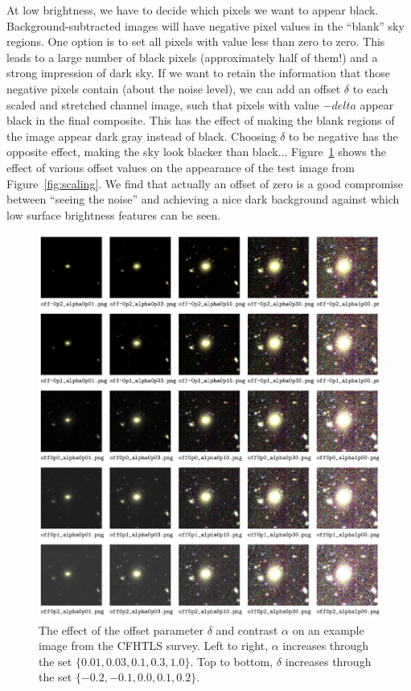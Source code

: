 \documentclass[letterpaper, 11pt]{article}
\begin{document}
At low brightness, we have to decide which pixels we want to appear black.
Background-subtracted images will have negative pixel values in the ``blank''
sky regions. One option is to set all pixels with value less than zero to
zero. This leads to a large number of black pixels (approximately half of
them!) and a strong impression of dark sky. If we want to retain the
information that those negative pixels contain (about the noise level), we can
add an offset $\delta$ to each scaled and stretched channel image, such that
pixels with value $-delta$ appear black in the final composite. This has the
effect of making the blank regions of the image appear dark gray instead of
black. Choosing $\delta$ to be negative has the opposite effect, making the
sky look blacker than black... Figure~\ref{fig:offset} shows the effect of
various offset values on the appearance of the test image from
Figure~\ref{fig:scaling}. We find that actually an offset of zero is a good
compromise between ``seeing the noise'' and achieving a nice dark background
against which low surface brightness features can be seen.

\begin{figure}
\centering\includegraphics[width=0.9\linewidth]{Images/CFHTLS_27_offset-alpha_gallery.png}
\caption{The effect of the offset parameter $\delta$ and contrast 
$\alpha$ on an
example image from the CFHTLS survey. Left to right, $\alpha$ increases
through the set $\{0.01,0.03,0.1,0.3,1.0\}$. Top to bottom, $\delta$ increases
through the set $\{-0.2,-0.1,0.0,0.1,0.2\}$.}
\label{fig:offset}
\end{figure}
\end{document}
